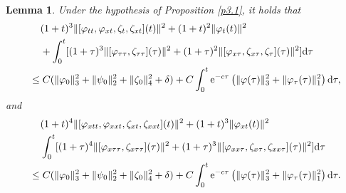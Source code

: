 \documentclass[11pt]{article}
\theoremstyle{plain}
\newtheorem{lemma}{Lemma}[section]
\numberwithin{equation}{section}
\begin{document}
	\begin{lemma}\label{l3.5}
		Under the hypothesis of Proposition \ref{p3.1}, it holds that
		\begin{align}\label{13.65}
			&\;\;\;\;(1+t)^3\|[\varphi_{tt},\varphi_{xt},\zeta_{t},\zeta_{xt}](t)\|^2+(1+t)^2\|\varphi_t(t)\|^2\notag\\
			&\;\;\;\;+\int_{0}^{t}[(1+\tau)^3\|[\varphi_{\tau\tau},\zeta_{\tau\tau}](\tau)\|^2+(1+\tau)^2\|[\varphi_{x\tau},\zeta_{x\tau},\zeta_{\tau}](\tau)\|^2]{\rm d}\tau\notag\\
			&\leq C(\|\varphi_0\|_3^2+\|\psi_0\|_2^2+\|\zeta_0\|_4^2+\delta)+C\int_{0}^{t}{\rm e}^{-c\tau}\left(\|\varphi(\tau)\|_3^2+\|\varphi_{\tau}(\tau)\|_1^2\right){\rm d}\tau,
		\end{align}
		and
		\begin{align}\label{13.66}
			&\;\;\;\;(1+t)^4\|[\varphi_{xtt},\varphi_{xxt},\zeta_{xt},\zeta_{xxt}](t)\|^2+(1+t)^3\|\varphi_{xt}(t)\|^2\notag\\
			&\;\;\;\;\int_{0}^{t}[(1+\tau)^4\|[\varphi_{x\tau\tau},\zeta_{x\tau\tau}](\tau)\|^2+(1+\tau)^3\|[\varphi_{xx\tau},\zeta_{x\tau},\zeta_{xx\tau}](\tau)\|^2]{\rm d}\tau\notag\\
			&\leq C(\|\varphi_0\|_3^2+\|\psi_0\|_2^2+\|\zeta_0\|_4^2+\delta)+C\int_{0}^{t}{\rm e}^{-c\tau}\left(\|\varphi(\tau)\|_3^2+\|\varphi_{\tau}(\tau)\|_1^2\right){\rm d}\tau.
		\end{align}
	\end{lemma}
\end{document}
